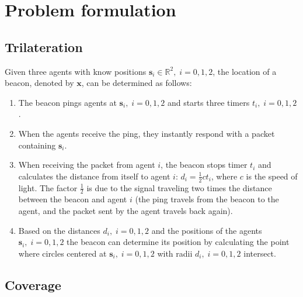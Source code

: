 \section{Problem formulation}

\subsection{Trilateration}
Given three agents with know positions $\mathbf{s}_{i}\in\mathbb{R}^{2},\;i=0, 1, 2$, the location 
of a beacon, denoted by $\mathbf{x}$, can be determined as follows:
\begin{enumerate}
  \item The beacon pings agents at $\mathbf{s}_{i},\;i=0, 1, 2$ and starts three timers $t_{i},\;i=0, 1, 2$.
  \item When the agents receive the ping, they instantly respond with a packet containing $\mathbf{s}_{i}$.
  \item When receiving the packet from agent ${i}$, the beacon stops timer $t_{i}$ and calculates the distance
  from itself to agent $i$: $d_{i} = \frac{1}{2}ct_{i}$, where $c$ is the speed of light. The factor $\frac{1}{2}$ is due to the signal traveling
  two times the distance between the beacon and agent $i$ (the ping travels from the beacon to the agent, and the packet
  sent by the agent travels back again).
  \item Based on the distances $d_{i},\;i=0, 1, 2$ and the positions of the agents $\mathbf{s}_{i},\;i=0, 1, 2$ the beacon can
  determine its position by calculating the point where circles centered at $\mathbf{s}_{i},\;i=0, 1, 2$ with radii $d_{i},\;i=0, 1, 2$ intersect.
\end{enumerate}

\subsection{Coverage}
